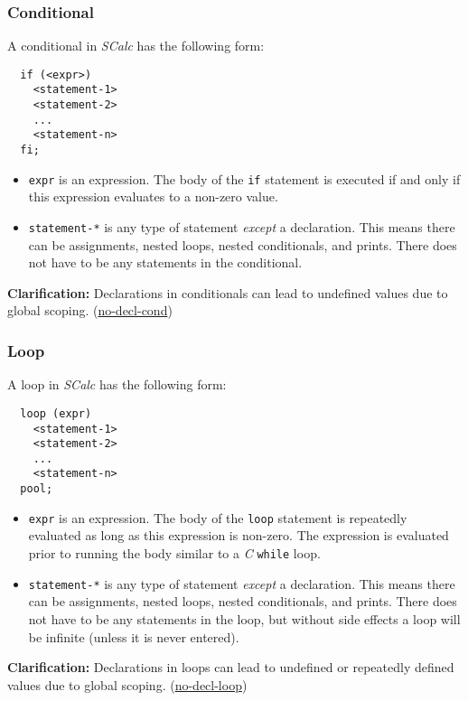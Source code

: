 \documentclass{article}
\newcommand{\code}[1]{\texttt{\textmd{#1}}}
\newcommand{\clarification}[2]{\textbf{Clarification: }#1 (\hyperlink{#2}{#2})}
\begin{document}
\subsubsection{Conditional}
\label{sssec:conditional}
A conditional in \textit{SCalc} has the following form:
\begin{lstlisting}
  if (<expr>)
    <statement-1>
    <statement-2>
    ...
    <statement-n>
  fi;
\end{lstlisting}

\begin {itemize}
  \item
    \code{expr} is an expression. The body of the \code{if} statement is executed if and only if
    this expression evaluates to a non-zero value.
  \item
    \code{statement-*} is any type of statement \textit{except} a declaration. This means there can
    be assignments, nested loops, nested conditionals, and prints. There does not have to be any
    statements in the conditional.
\end{itemize}

\clarification{Declarations in conditionals can lead to undefined values due to global scoping.}
{no-decl-cond}

\subsubsection{Loop}
\label{sssec:loop}
A loop in \textit{SCalc} has the following form:
\begin{lstlisting}
  loop (expr)
    <statement-1>
    <statement-2>
    ...
    <statement-n>
  pool;
\end{lstlisting}

\begin {itemize}
  \item
  \code{expr} is an expression. The body of the \code{loop} statement is repeatedly evaluated as
  long as this expression is non-zero. The expression is evaluated prior to running the body
  similar to a \textit{C} \code{while} loop.
  \item
    \code{statement-*} is any type of statement \textit{except} a declaration. This means there can
    be assignments, nested loops, nested conditionals, and prints. There does not have to be any
    statements in the loop, but without side effects a loop will be infinite (unless it is never
    entered).
\end{itemize}

\clarification{Declarations in loops can lead to undefined or repeatedly defined values due to
global scoping.} {no-decl-loop}
\end{document}
